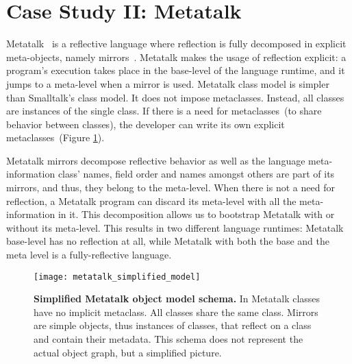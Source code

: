 

\section{Case Study II: Metatalk} \label{sec:bootstrap_metatalk}

Metatalk~\cite{Papo11a} is a reflective language where reflection is fully decomposed in explicit meta-objects, namely mirrors~\cite{Brac04b}. Metatalk makes the usage of reflection explicit: a program's execution takes place in the base-level of the language runtime, and it jumps to a meta-level when a mirror is used. Metatalk class model is simpler than Smalltalk's class model. It does not impose metaclasses. Instead, all classes are instances of the single  class. If there is a need for metaclasses~(to share behavior between classes), the developer can write its own explicit metaclasses~(Figure \ref{fig:metatalk_simplified_model}).

Metatalk mirrors decompose reflective behavior as well as the language meta-information \ie class' names, field order and names amongst others are part of its mirrors, and thus, they belong to the meta-level. When there is not a need for reflection, a Metatalk program can discard its meta-level with all the meta-information in it. This decomposition allows us to bootstrap Metatalk with or without its meta-level. This results in two different language runtimes: Metatalk base-level has no reflection at all, while Metatalk with both the base and the meta level is a fully-reflective language.

\begin{figure}[ht]
\center
\texttt{[image: metatalk\_simplified\_model]}
\caption{\textbf{Simplified Metatalk object model schema.} In Metatalk classes have no implicit metaclass. All classes share the same class. Mirrors are simple objects, thus instances of classes, that reflect on a class and contain their metadata. This schema does not represent the actual object graph, but a simplified picture.\label{fig:metatalk_simplified_model}}
\end{figure}

